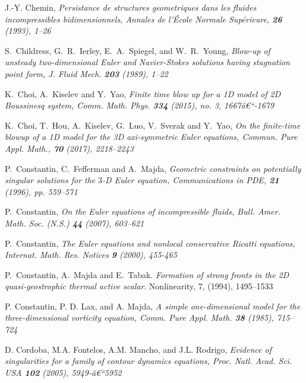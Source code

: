 \documentclass[reqno,centertags, 11pt]{amsart}
\begin{document}
\begin{thebibliography}{99}
 J.-Y. Chemin, \it
Persistance de structures geometriques dans les fluides
incompressibles
bidimensionnels, \rm Annales de l'\'Ecole Normale Sup\'erieure, {\bf 26} (1993), 1--26

 S.~Childress, G.~R.~Ierley, E.~A.~Spiegel, and W.~R.~Young, \it Blow-up of unsteady two-dimensional Euler
and Navier-Stokes solutions having stagnation point form, \rm J. Fluid Mech. {\bf 203} (1989), 1--22

  K.~Choi, A.~Kiselev and Y.~Yao, \it Finite time blow up for a 1D model of 2D Boussinesq system, \rm  Comm. Math. Phys. {\bf 334} (2015), no. 3, 1667â€“-1679

 K.~Choi, T.~Hou, A.~Kiselev, G.~Luo, V.~Sverak and Y.~Yao, \it On the finite-time blowup of a 1D model for the 3D axi-symmetric Euler equations,
\rm Commun. Pure Appl. Math., {\bf 70} (2017), 2218--2243



P.~Constantin, C.~Fefferman and A.~Majda, \it
Geometric constraints on potentially singular solutions for the
$3$-D Euler equation, \rm
Communications in PDE, {\bf 21} (1996), pp. 559--571

 P.~Constantin, \it
On the Euler equations of incompressible fluids, \rm
Bull. Amer. Math. Soc. (N.S.) {\bf 44} (2007), 603--621

 P.~Constantin, \it The Euler equations and nonlocal conservative Ricatti equations, \rm
Internat. Math. Res. Notices {\bf 9} (2000), 455-465

 P.~Constantin, A.~Majda and E.~Tabak. \textit{Formation
of strong fronts in the 2D quasi-geostrophic thermal active scalar}.
Nonlinearity, 7, (1994), 1495--1533

 P. Constantin, P. D. Lax, and A. Majda, \it A simple one-dimensional model for the three-dimensional vorticity equation, \rm Comm. Pure Appl. Math. {\bf 38} (1985), 715--724

D. Cordoba, M.A. Fontelos, A.M. Mancho, and J.L. Rodrigo,
\it Evidence of singularities for a family of contour dynamics
equations, \rm Proc. Natl. Acad. Sci. USA {\bf 102} (2005), 5949-â€“5952


\end{thebibliography}
\end{document}

